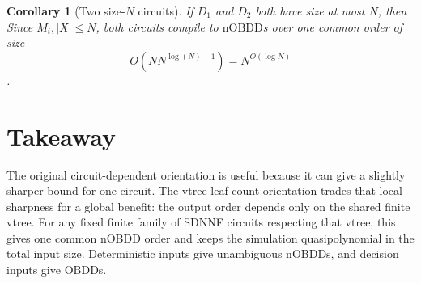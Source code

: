 \documentclass[11pt]{article}
\theoremstyle{plain}
\newtheorem{corollary}[theorem]{Corollary}
\theoremstyle{definition}
\theoremstyle{remark}
\newcommand{\nOBDD}{\mathrm{nOBDD}}
\begin{document}
\begin{corollary}[Two size-$N$ circuits]
If $D_1$ and $D_2$ both have size at most $N$, then
Since $M_i, |X|\leq N$, both circuits compile to $\nOBDD$s over one common order of
size
\[
  O(NN^{\log(N) + 1}) = N^{O(\log N)}
\].

\end{corollary}

\section{Takeaway}

The original circuit-dependent orientation is useful because it can give a
slightly sharper bound for one circuit.  The vtree leaf-count orientation trades
that local sharpness for a global benefit: the output order depends only on the
shared finite vtree.  For any fixed finite family of SDNNF circuits respecting
that vtree, this gives one common nOBDD order and keeps the simulation
quasipolynomial in the total input size.  Deterministic inputs give unambiguous
nOBDDs, and decision inputs give OBDDs.
\end{document}

